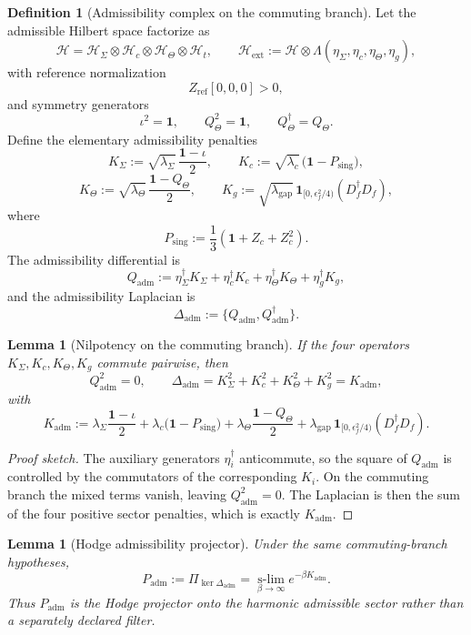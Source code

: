 \documentclass[11pt,a4paper]{article}
\newtheorem{lemma}[theorem]{Lemma}
\theoremstyle{definition}
\newtheorem{definition}[theorem]{Definition}
\theoremstyle{remark}
\newcommand{\Seam}{\Sigma}
\newcommand{\inv}{\iota}
\newcommand{\Kadm}{K_{\mathrm{adm}}}
\newcommand{\Padm}{P_{\mathrm{adm}}}
\begin{document}
\begin{definition}[Admissibility complex on the commuting branch]
\label{def:admissibility-complex}
Let the admissible Hilbert space factorize as
\[
\mathcal H=\mathcal H_{\Seam}\otimes\mathcal H_c\otimes\mathcal H_\Theta\otimes\mathcal H_t,
\qquad
\mathcal H_{\mathrm{ext}}
:=
\mathcal H\otimes\Lambda(\eta_\Sigma,\eta_c,\eta_\Theta,\eta_g),
\]
with reference normalization
\[
Z_{\mathrm{ref}}[0,0,0]>0,
\]
and symmetry generators
\[
\inv^2=\mathbf 1,
\qquad
Q_\Theta^2=\mathbf 1,
\qquad
Q_\Theta^\dagger=Q_\Theta.
\]
Define the elementary admissibility penalties
\[
K_\Sigma:=\sqrt{\lambda_\Sigma}\,\frac{\mathbf 1-\inv}{2},
\qquad
K_c:=\sqrt{\lambda_c}\,\bigl(\mathbf 1-P_{\mathrm{sing}}\bigr),
\]
\[
K_\Theta:=\sqrt{\lambda_\Theta}\,\frac{\mathbf 1-Q_\Theta}{2},
\qquad
K_g:=\sqrt{\lambda_{\mathrm{gap}}}\,\mathbf 1_{[0,\epsilon_f^2/4)}(D_f^\dagger D_f),
\]
where
\[
P_{\mathrm{sing}}:=\frac13(\mathbf 1+Z_c+Z_c^2).
\]
The admissibility differential is
\[
Q_{\mathrm{adm}}
:=
\eta_\Sigma^\dagger K_\Sigma
+\eta_c^\dagger K_c
+\eta_\Theta^\dagger K_\Theta
+\eta_g^\dagger K_g,
\]
and the admissibility Laplacian is
\[
\Delta_{\mathrm{adm}}:=\{Q_{\mathrm{adm}},Q_{\mathrm{adm}}^\dagger\}.
\]
\end{definition}

\begin{lemma}[Nilpotency on the commuting branch]
\label{lem:admissibility-nilpotency}
If the four operators $K_\Sigma,K_c,K_\Theta,K_g$ commute pairwise, then
\[
Q_{\mathrm{adm}}^2=0,
\qquad
\Delta_{\mathrm{adm}}
=
K_\Sigma^2+K_c^2+K_\Theta^2+K_g^2
=
\Kadm,
\]
with
\[
\Kadm
:=
\lambda_\Sigma\frac{\mathbf 1-\inv}{2}
+\lambda_c\bigl(\mathbf 1-P_{\mathrm{sing}}\bigr)
+\lambda_\Theta\frac{\mathbf 1-Q_\Theta}{2}
+\lambda_{\mathrm{gap}}\,\mathbf 1_{[0,\epsilon_f^2/4)}(D_f^\dagger D_f).
\]
\end{lemma}

\begin{proof}[Proof sketch]
The auxiliary generators $\eta_i^\dagger$ anticommute, so the square of $Q_{\mathrm{adm}}$ is controlled by the commutators of the corresponding $K_i$. On the commuting branch the mixed terms vanish, leaving $Q_{\mathrm{adm}}^2=0$. The Laplacian is then the sum of the four positive sector penalties, which is exactly $\Kadm$.
\end{proof}

\begin{lemma}[Hodge admissibility projector]
\label{lem:hodge-admissibility-projector}
Under the same commuting-branch hypotheses,
\[
\Padm
:=
\Pi_{\ker\Delta_{\mathrm{adm}}}
=
\operatorname*{s-lim}_{\beta\to\infty}e^{-\beta\Kadm}.
\]
Thus $\Padm$ is the Hodge projector onto the harmonic admissible sector rather than a separately declared filter.
\end{lemma}
\end{document}
